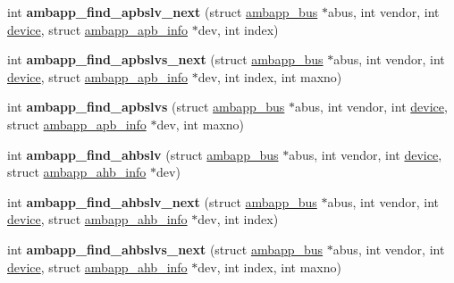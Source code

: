 \begin{DoxyCompactItemize}
int {\bfseries ambapp\+\_\+find\+\_\+apbslv\+\_\+next} (struct \mbox{\hyperlink{structambapp__bus}{ambapp\+\_\+bus}} $\ast$abus, int vendor, int \mbox{\hyperlink{structdevice}{device}}, struct \mbox{\hyperlink{structambapp__apb__info}{ambapp\+\_\+apb\+\_\+info}} $\ast$dev, int index)
\item 
\mbox{\label{group__amba_ga172b61f402166601c5dd20bd5f7b459e}} 
int {\bfseries ambapp\+\_\+find\+\_\+apbslvs\+\_\+next} (struct \mbox{\hyperlink{structambapp__bus}{ambapp\+\_\+bus}} $\ast$abus, int vendor, int \mbox{\hyperlink{structdevice}{device}}, struct \mbox{\hyperlink{structambapp__apb__info}{ambapp\+\_\+apb\+\_\+info}} $\ast$dev, int index, int maxno)
\item 
\mbox{\label{group__amba_ga80e24d14cefcc6d6b4a81ad105a3f980}} 
int {\bfseries ambapp\+\_\+find\+\_\+apbslvs} (struct \mbox{\hyperlink{structambapp__bus}{ambapp\+\_\+bus}} $\ast$abus, int vendor, int \mbox{\hyperlink{structdevice}{device}}, struct \mbox{\hyperlink{structambapp__apb__info}{ambapp\+\_\+apb\+\_\+info}} $\ast$dev, int maxno)
\item 
\mbox{\label{group__amba_ga9bd3ba183a25704624e66e29c5a9874b}} 
int {\bfseries ambapp\+\_\+find\+\_\+ahbslv} (struct \mbox{\hyperlink{structambapp__bus}{ambapp\+\_\+bus}} $\ast$abus, int vendor, int \mbox{\hyperlink{structdevice}{device}}, struct \mbox{\hyperlink{structambapp__ahb__info}{ambapp\+\_\+ahb\+\_\+info}} $\ast$dev)
\item 
\mbox{\label{group__amba_gac8e50337b0d9fc0e7936bc0ece3a1236}} 
int {\bfseries ambapp\+\_\+find\+\_\+ahbslv\+\_\+next} (struct \mbox{\hyperlink{structambapp__bus}{ambapp\+\_\+bus}} $\ast$abus, int vendor, int \mbox{\hyperlink{structdevice}{device}}, struct \mbox{\hyperlink{structambapp__ahb__info}{ambapp\+\_\+ahb\+\_\+info}} $\ast$dev, int index)
\item 
\mbox{\label{group__amba_ga84b846e15bc55157bbb70d4d2b122651}} 
int {\bfseries ambapp\+\_\+find\+\_\+ahbslvs\+\_\+next} (struct \mbox{\hyperlink{structambapp__bus}{ambapp\+\_\+bus}} $\ast$abus, int vendor, int \mbox{\hyperlink{structdevice}{device}}, struct \mbox{\hyperlink{structambapp__ahb__info}{ambapp\+\_\+ahb\+\_\+info}} $\ast$dev, int index, int maxno)
\item 

\end{DoxyCompactItemize}
